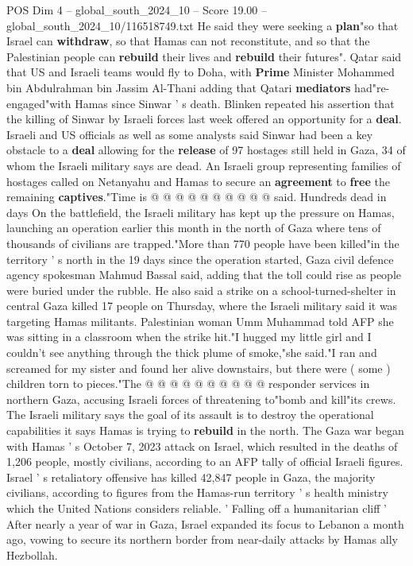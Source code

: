\begin{textsample}{POS Dim 4 – global\_south\_2024\_10 – Score 19.00 – global\_south\_2024\_10/116518749.txt}
He said they were seeking a \textbf{plan}"so that Israel can \textbf{withdraw}, so that Hamas can not reconstitute, and so that the Palestinian people can \textbf{rebuild} their lives and \textbf{rebuild} their futures".
Qatar said that US and Israeli teams would fly to Doha, with \textbf{Prime} Minister Mohammed bin Abdulrahman bin Jassim Al-Thani adding that Qatari \textbf{mediators} had"re-engaged"with Hamas since Sinwar ' s death.
Blinken repeated his assertion that the killing of Sinwar by Israeli forces last week offered an opportunity for a \textbf{deal}.
Israeli and US officials as well as some analysts said Sinwar had been a key obstacle to a \textbf{deal} allowing for the \textbf{release} of 97 hostages still held in Gaza, 34 of whom the Israeli military says are dead.
An Israeli group representing families of hostages called on Netanyahu and Hamas to secure an \textbf{agreement} to \textbf{free} the remaining \textbf{captives}."Time is @ @ @ @ @ @ @ @ @ @ said.
Hundreds dead in days On the battlefield, the Israeli military has kept up the pressure on Hamas, launching an operation earlier this month in the north of Gaza where tens of thousands of civilians are trapped."More than 770 people have been killed"in the territory ' s north in the 19 days since the operation started, Gaza civil defence agency spokesman Mahmud Bassal said, adding that the toll could rise as people were buried under the rubble.
He also said a strike on a school-turned-shelter in central Gaza killed 17 people on Thursday, where the Israeli military said it was targeting Hamas militants.
Palestinian woman Umm Muhammad told AFP she was sitting in a classroom when the strike hit."I hugged my little girl and I couldn't see anything through the thick plume of smoke,"she said."I ran and screamed for my sister and found her alive downstairs, but there were ( some ) children torn to pieces."The @ @ @ @ @ @ @ @ @ @ responder services in northern Gaza, accusing Israeli forces of threatening to"bomb and kill"its crews.
The Israeli military says the goal of its assault is to destroy the operational capabilities it says Hamas is trying to \textbf{rebuild} in the north.
The Gaza war began with Hamas ' s October 7, 2023 attack on Israel, which resulted in the deaths of 1,206 people, mostly civilians, according to an AFP tally of official Israeli figures.
Israel ' s retaliatory offensive has killed 42,847 people in Gaza, the majority civilians, according to figures from the Hamas-run territory ' s health ministry which the United Nations considers reliable. ' Falling off a humanitarian cliff ' After nearly a year of war in Gaza, Israel expanded its focus to Lebanon a month ago, vowing to secure its northern border from near-daily attacks by Hamas ally Hezbollah.

\end{textsample}
